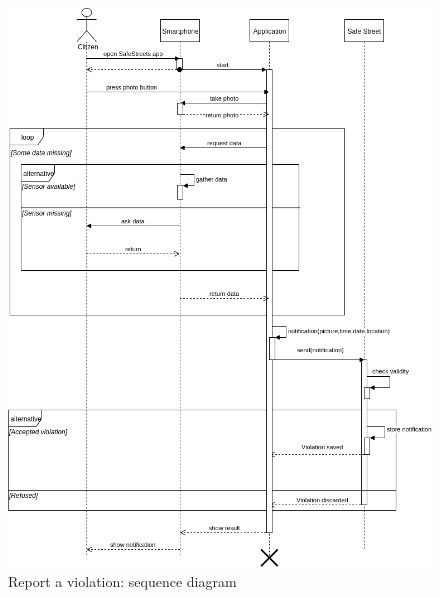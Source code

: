 \documentclass{article}
\begin{document}
	\begin{figure}[H]
				
		\centering
		\includegraphics[width=\linewidth]{Images/Report_violation_sequence_diagram.png}
		\caption{Report a violation: sequence diagram}
		
	\end{figure}
	
\end{document}
